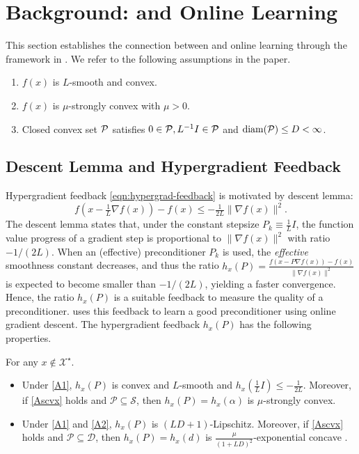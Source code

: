 \section{Background: {\hdm} and Online Learning} \label{sec:hdm-ol}

This section establishes the connection between {\hdm} and online learning through the framework in \cite{gao2024gradient}. 
We refer to the following assumptions in the paper.

\begin{enumerate}[leftmargin=30pt,label=\textbf{A\arabic*:},ref=\rm{\textbf{A\arabic*}},start=1]
  \item $f(x)$ is $L$-smooth and convex.  \label{A1}
  \item $f(x)$ is $\mu$-strongly convex with $\mu > 0$. \label{Ascvx}
  \item Closed convex set $\mathcal{P}$ satisfies $0 \in \mathcal{P}, L^{-1} I\in \mathcal{P}$ and $\mathrm{diam} (\mathcal{P}) \leq D < \infty$. \label{A2}
\end{enumerate}

\subsection{Descent Lemma and Hypergradient Feedback}

Hypergradient feedback \eqref{eqn:hypergrad-feedback} is motivated by  descent lemma:
\[ f ( x - \tfrac{1}{L} \nabla f (x) ) - f (x) \leq - \tfrac{1}{2
   L} \| \nabla f (x) \|^2 . \]
The descent lemma states that, under the constant stepsize $P_k \equiv \tfrac{1}{L} I$,
the function value progress of a gradient step is proportional to $\| \nabla f
(x) \|^2$ with ratio $- 1/(2L)$. 
When an (effective) preconditioner $P_k$ is used, the \emph{effective} smoothness constant decreases, and thus the ratio $h_x (P) = \tfrac{f (x - P \nabla f (x)) - f (x)}{\| \nabla f (x) \|^2}$ is expected to become smaller than $- 1 / (2 L)$, yielding a faster convergence. 
Hence, the ratio $h_x (P)$ is a suitable feedback to measure the quality of a preconditioner. {\hdm} uses this
feedback to learn a good preconditioner using online gradient descent. The hypergradient feedback $h_x (P)$ has the following properties.

\begin{lem}\label{lem:hx-properties}
  For any $x \nin \mathcal{X}^{\star}$.
  \begin{itemize}[leftmargin=10pt]
    \item Under \ref{A1}, $h_x (P)$ is convex and $L$-smooth and $h_x(\frac{1}{L}I)\leq -\frac{1}{2L}$. Moreover, if \ref{Ascvx} holds and $\mathcal{P} \subseteq \mathcal{S}$,
    then $h_x (P) = h_x (\alpha)$ is $\mu$-strongly convex. 
    
    \item Under \ref{A1} and \ref{A2}, $h_x (P)$ is  $(L D + 1)$-Lipschitz. Moreover, if \ref{Ascvx} holds and $\mathcal{P} \subseteq \mathcal{D}$,
    then $h_x (P) = h_x (d)$ is $\frac{\mu}{(1 + L D)^2}$-exponential concave \cite{hazan2007logarithmic}.
  \end{itemize}
\end{lem}


